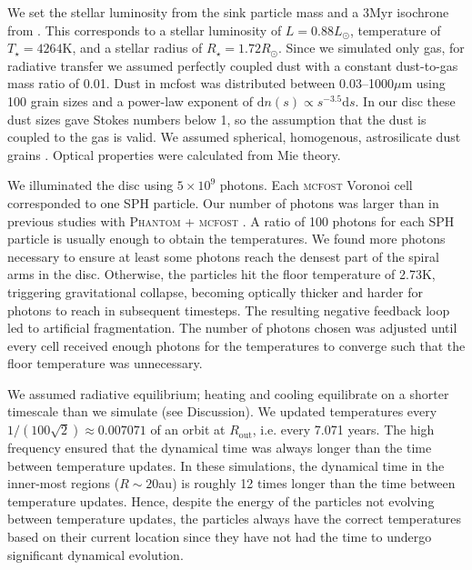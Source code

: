 \documentclass[usenatbib]{mnras}
\begin{document}
We set the stellar luminosity from the sink particle mass and a 3Myr isochrone from \cite{2000Siess}. This corresponds to a stellar luminosity of $L=0.88L_\odot$, temperature of $T_\star = 4264$K, and a stellar radius of $R_\star = 1.72R_\odot$.
Since we simulated only gas, for radiative transfer we assumed perfectly coupled dust with a constant dust-to-gas mass ratio of 0.01. Dust in {\sc mcfost} was distributed between 0.03--1000$\mu$m  using 100 grain sizes and a power-law exponent of $\mathrm{d}n(s) \propto s^{-3.5} \mathrm{d}s$. In our disc these dust sizes gave Stokes numbers below 1, so the assumption that the dust is coupled to the gas is valid. We assumed spherical, homogenous, astrosilicate dust grains \citep{Weingartner2001}. Optical properties were calculated from Mie theory.

We illuminated the disc using $5 \times 10^9$ photons. Each \textsc{mcfost} Voronoi cell corresponded to one SPH particle. Our number of photons was larger than in previous studies with \textsc{Phantom + mcfost} \citep{2020Nealon,2022aBorchert,2022bBorchert}. A ratio of 100 photons for each SPH particle is usually enough to obtain the temperatures. We found more photons necessary to ensure at least some photons reach the densest part of the spiral arms in the disc. Otherwise, the particles hit the floor temperature of 2.73K, triggering gravitational collapse, becoming optically thicker and harder for photons to reach in subsequent timesteps. The resulting negative feedback loop led to artificial fragmentation. The number of photons chosen was adjusted until every cell received enough photons for the temperatures to converge such that the floor temperature was unnecessary.

We assumed radiative equilibrium; heating and cooling equilibrate on a shorter timescale than we simulate (see Discussion). We updated temperatures every ${1/(100\sqrt{2}) \approx 0.007071}$ of an orbit at $R_\mathrm{out}$, i.e. every 7.071 years. The high frequency ensured that the dynamical time was always longer than the time between temperature updates. In these simulations, the dynamical time in the inner-most regions ($R \sim 20$au) is roughly 12 times longer than the time between temperature updates. Hence, despite the energy of the particles not evolving between temperature updates, the particles always have the correct temperatures based on their current location since they have not had the time to undergo significant dynamical evolution.
\end{document}
